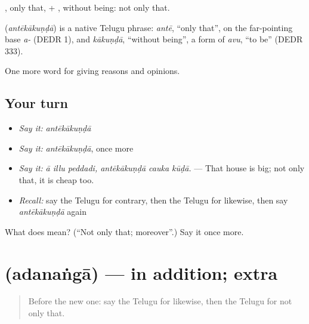 , only that, + , without being: not only that.

\begin{cousinweb}
\textbf{} (\emph{antēkākuṇḍā}) is a native Telugu phrase: \emph{antē}, \textquotedblleft{}only that\textquotedblright{}, on the far-pointing base \emph{a-} (DEDR 1), and \emph{kākuṇḍā}, \textquotedblleft{}without being\textquotedblright{}, a form of \emph{avu}, \textquotedblleft{}to be\textquotedblright{} (DEDR 333).
\end{cousinweb}

\begin{grammarlens}[title={What you've built}]
One more word for giving reasons and opinions.
\end{grammarlens}

\subsection*{Your turn}
\begin{itemize}
\raggedright
  \item \emph{Say it:} \emph{antēkākuṇḍā}
  \item \emph{Say it:} \emph{antēkākuṇḍā}, once more
  \item \emph{Say it:} \emph{ā illu peddadi, antēkākuṇḍā cauka kūḍā.} — That house is big; not only that, it is cheap too.
  \item \emph{Recall:} say the Telugu for contrary, then the Telugu for likewise, then say \emph{antēkākuṇḍā} again
\end{itemize}

\begin{tcolorbox}[breakable,colback=teal!4,colframe=teal!35!black,title={Before you move on}]
What does  mean? (\textquotedblleft{}Not only that; moreover\textquotedblright{}.) Say it once more.
\end{tcolorbox}
\section[\texorpdfstring{\te{అదనంగా} (adanaṅgā)}{అదనంగా (adanaṅgā)}]{ (adanaṅgā) — in addition; extra}

\label{lesson:TE-C397-adananga}



\begin{quote}
Before the new one: say the Telugu for likewise, then the Telugu for not only that.
\end{quote}

